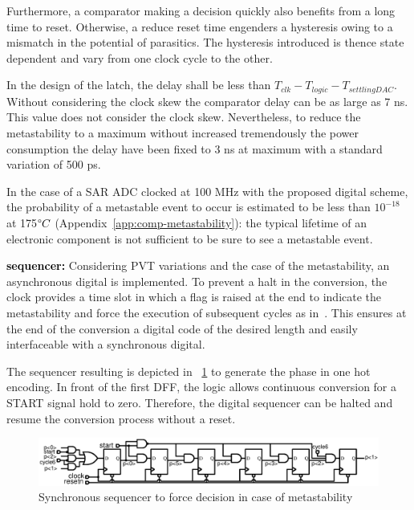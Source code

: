 Furthermore, a comparator making a decision quickly also benefits from a long time to reset. Otherwise, a reduce reset time engenders a hysteresis owing to a mismatch in the potential of parasitics. The hysteresis introduced is thence state dependent and vary from one clock cycle to the other. 

In the design of the latch, the delay shall be less than \(T_{clk} -  T_{logic} - T_{settlingDAC}\). Without considering the clock skew the comparator delay can be as large as 7 ns. This value does not consider the clock skew. Nevertheless, to reduce the metastability to a maximum without increased tremendously the power consumption the delay have been fixed to 3 ns at maximum with a standard variation of 500 ps.

In the case of a SAR ADC clocked at 100 MHz with the proposed digital scheme, the probability of a metastable event to occur is estimated to be less than $10^{-18}$ at 175$\degree C$ (Appendix~\ref{app:comp-metastability}): the typical lifetime of an electronic component is not sufficient to be sure to see a metastable event.

\textbf{\textcolor{black}{sequencer:}}
Considering PVT variations and the case of the metastability, an asynchronous digital is implemented. To prevent a halt in the conversion, the clock provides a time slot in which a flag is raised at the end to indicate the metastability and force the execution of subsequent cycles as in~\cite{Tung2016}. This ensures at the end of the conversion a digital code of the desired length and easily interfaceable with a synchronous digital.

The sequencer resulting is depicted in \figurename~\ref{fig:sar-async-sequencer} to generate the phase in one hot encoding. In front of the first DFF, the logic allows continuous conversion for a START signal hold to zero. Therefore, the digital sequencer can be halted and resume the conversion process without a reset.

\begin{figure}[htp]
	\centering
	\includegraphics[width=\textwidth]{Chapter4/Figs/sar-sequencer.ps}
	\caption{Synchronous sequencer to force decision in case of metastability}
	\label{fig:sar-async-sequencer}
\end{figure}

